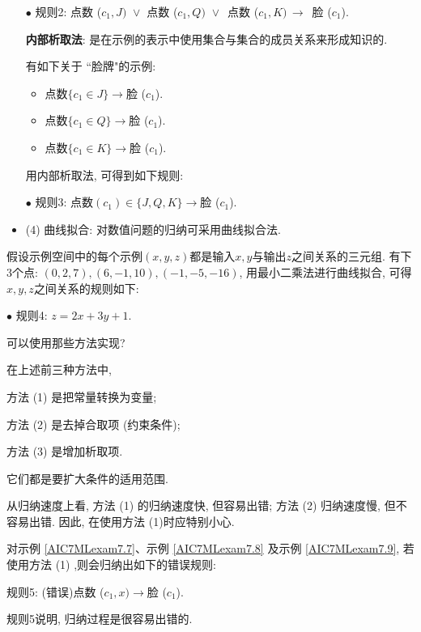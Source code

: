 \begin{itemize}
\begin{example}
 $\bullet$ 规则2: 点数 ($c_1, J)\,\, \vee$ 点数 ($c_1, Q)\,\, \vee$\, 点数 ($c_1, K)\, \rightarrow$\, 脸 ($c_1$).
\end{example}

 \textbf{内部析取法}: 是在示例的表示中使用集合与集合的成员关系来形成知识的.

\begin{example}\label{AIC7MLexam7.8}
有如下关于 ``脸牌"的示例:
\begin{itemize}
\item 点数$\{c_1\in {J}\}\rightarrow$脸 ($c_1$).
\item 点数$\{c_1\in {Q}\}\rightarrow$脸 ($c_1$).
\item 点数$\{c_1\in {K}\}\rightarrow$脸 ($c_1$).
\end{itemize}

用内部析取法, 可得到如下规则:
\begin{center}
    $\bullet$ 规则3: 点数$ (c_1)\in \{J, Q, K\}\rightarrow$脸 ($c_1$).
\end{center}
\vspace{-0.5cm}
\end{example}
\item (4) 曲线拟合: 对数值问题的归纳可采用曲线拟合法.
\end{itemize}

\begin{example}\label{AIC7MLexam7.9}
假设示例空间中的每个示例$ (x, y, z)$都是输入$x, y$与输出$z$之间关系的三元组.
有下3个点: $ (0, 2, 7), (6, -1, 10), (-1, -5, -16)$, 用最小二乘法进行曲线拟合, 可得$x, y, z$之间关系的规则如下:

\begin{center}
    $\bullet$ 规则4: $z=2x+3y+1$.
\end{center}
可以使用那些方法实现?
\vspace{-0.5cm}
\end{example}
\begin{remark}
在上述前三种方法中,

方法 (1) 是把常量转换为变量;

方法 (2) 是去掉合取项 (约束条件);

方法 (3) 是增加析取项.

它们都是要扩大条件的适用范围.

从归纳速度上看, 方法 (1) 的归纳速度快, 但容易出错; 方法 (2) 归纳速度慢, 但不容易出错.
因此, 在使用方法 (1)时应特别小心.

\begin{example}
对示例 \ref{AIC7MLexam7.7}、示例 \ref{AIC7MLexam7.8} 及示例  \ref{AIC7MLexam7.9}, 若使用方法 (1) ,则会归纳出如下的错误规则:

\begin{center}
    规则5: (错误)点数 ($c_1, x)\rightarrow$脸 ($c_1$).
\end{center}

规则5说明, 归纳过程是很容易出错的.
\end{example}
\end{remark}
